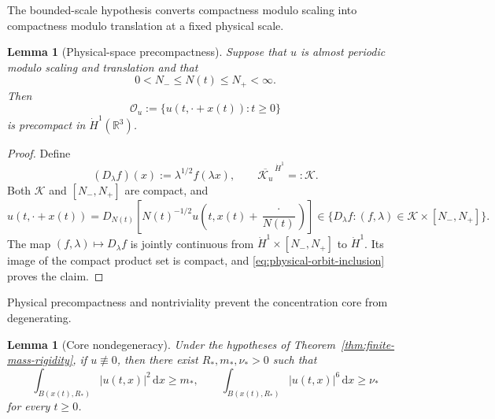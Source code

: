 \documentclass{interact}
\numberwithin{equation}{section}
\theoremstyle{plain}
\newtheorem{lemma}[theorem]{Lemma}
\theoremstyle{definition}
\theoremstyle{remark}
\newcommand{\R}{\mathbb R}
\newcommand{\dd}{\,\mathrm d}
\begin{document}
The bounded-scale hypothesis converts compactness modulo scaling into compactness modulo translation at a fixed physical scale.

\begin{lemma}[Physical-space precompactness]\label{lem:physical-precompactness}
Suppose that $u$ is almost periodic modulo scaling and translation and that
\[
 0<N_-\le N(t)\le N_+<\infty.
\]
Then
\[
 \mathcal O_u:=\{u(t,\cdot+x(t)):t\ge0\}
\]
is precompact in $\dot H^1(\R^3)$.
\end{lemma}

\begin{proof}
Define
\[
 (D_\lambda f)(x):=\lambda^{1/2}f(\lambda x),
 \qquad
 \overline{\mathcal K_u}^{\,\dot H^1}=: \mathcal K.
\]
Both $\mathcal K$ and $[N_-,N_+]$ are compact, and
\begin{equation}\label{eq:physical-orbit-inclusion}
 u(t,\cdot+x(t))
 =D_{N(t)}\left[N(t)^{-1/2}
 u\left(t,x(t)+\frac{\cdot}{N(t)}\right)\right]
 \in\{D_\lambda f:(f,\lambda)\in\mathcal K\times[N_-,N_+]\}.
\end{equation}
The map $(f,\lambda)\mapsto D_\lambda f$ is jointly continuous from $\dot H^1\times[N_-,N_+]$ to $\dot H^1$. Its image of the compact product set is compact, and \eqref{eq:physical-orbit-inclusion} proves the claim.
\end{proof}

Physical precompactness and nontriviality prevent the concentration core from degenerating.

\begin{lemma}[Core nondegeneracy]\label{lem:core-nondegeneracy}
Under the hypotheses of Theorem~\ref{thm:finite-mass-rigidity}, if $u\not\equiv0$, then there exist $R_*,m_*,\nu_*>0$ such that
\begin{equation}\label{eq:core-mass-l6}
 \int_{B(x(t),R_*)}|u(t,x)|^2\dd x\ge m_*,
 \qquad
 \int_{B(x(t),R_*)}|u(t,x)|^6\dd x\ge\nu_*
\end{equation}
for every $t\ge0$.
\end{lemma}
\end{document}
